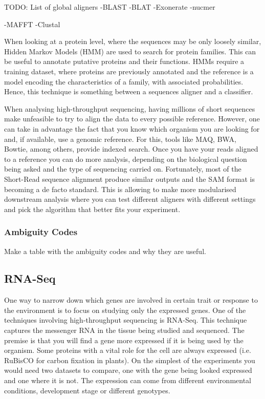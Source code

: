 TODO: List of global aligners
-BLAST
-BLAT
-Exonerate
-nucmer

-MAFFT
-Clustal


When looking at a protein level, where the sequences may be only loosely similar, Hidden Markov Models (HMM) are used to search for protein families. This can be useful to annotate putative proteins and their functions. HMMs require a training dataset, where proteins are previously annotated and the reference is a model encoding the characteristics of a family, with associated probabilities. Hence, this technique is something between a sequences aligner and a classifier\cite{Eddy2004}. 

When analysing high-throughput sequencing, having millions of short sequences make unfeasible to try to align the data to every possible reference. However, one can take in advantage the fact that you know which organism you are looking for and, if available, use a genomic reference. For this, tools like MAQ, BWA, Bowtie, among others, provide indexed search.  Once you have your reads aligned to a reference you can do more analysis, depending on the biological question being asked and the type of sequencing carried on.  Fortunately, most of the Short-Read sequence alignment produce similar outputs and the SAM format is becoming a de facto standard. This is allowing to make more modularised downstream analysis where you can test different aligners with different settings and pick the algorithm that better fits your experiment\cite{Liu2012,Li2009,Li2009a}. 

\subsubsection{Ambiguity Codes}
\label{lit:ambiguity}
Make a table with the ambiguity codes and why they are useful. 




\subsection{RNA-Seq}
\label{lit:RNASeq}

One way to narrow down which genes are involved in certain trait or response to the environment is to focus on studying only the expressed genes. One of the techniques involving high-throughput sequencing is RNA-Seq. This technique captures the messenger RNA in the tissue being studied and sequenced. The premise is that you will find a gene more expressed if it is being used by the organism. Some proteins with a vital role for the cell are always expressed (i.e. RuBisCO for carbon fixation in plants\cite{CooperGM2000}). On the simplest of the experiments you would need two datasets to compare, one with the gene being looked expressed and one where it is not. The expression can come from different environmental conditions, development stage or different genotypes.\cite{Mortazavi2008} 

